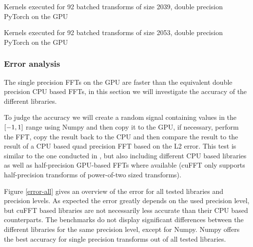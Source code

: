 \documentclass[english,11pt,a4paper,table]{article} %
\let\originalleft\left
\let\originalright\right
\renewcommand{\left}{\mathopen{}\mathclose\bgroup\originalleft}
\renewcommand{\right}{\aftergroup\egroup\originalright}
\begin{document}
\begin{table}[H]
	\centering
	\begin{footnotesize}
	
	\end{footnotesize}
	\caption{Kernels executed for 92 batched transforms of size 2039, double precision PyTorch on the GPU}
	\label{pytorch-2039}
\end{table}

\begin{table}[H]
	\centering
	\begin{footnotesize}
	
	\end{footnotesize}
	\caption{Kernels executed for 92 batched transforms of size 2053, double precision PyTorch on the GPU}
	\label{pytorch-2053}
\end{table}

\subsubsection{Error analysis}

The single precision FFTs on the GPU are faster than the equivalent double precision CPU based FFTs, in this section we will investigate the accuracy of the different libraries.

To judge the accuracy we will create a random signal containing values in the $\left[-1,1\right]$ range using Numpy and then copy it to the GPU, if necessary, perform the FFT, copy the result back to the CPU and then compare the result to the result of a CPU based quad precision FFT based on the L2 error.
This test is similar to the one conducted in \cite{vkfft}, but also including different CPU based libraries as well as half-precision GPU-based FFTs where available (cuFFT only supports half-precision transforms of power-of-two sized transforms).

Figure \ref{error-all} gives an overview of the error for all tested libraries and precision levels.
As expected the error greatly depends on the used precision level, but cuFFT based libraries are not necessarily less accurate than their CPU based counterparts.
The benchmarks do not display significant differences between the different libraries for the same precision level, except for Numpy.
Numpy offers the best accuracy for single precision transforms out of all tested libraries.
\end{document}
